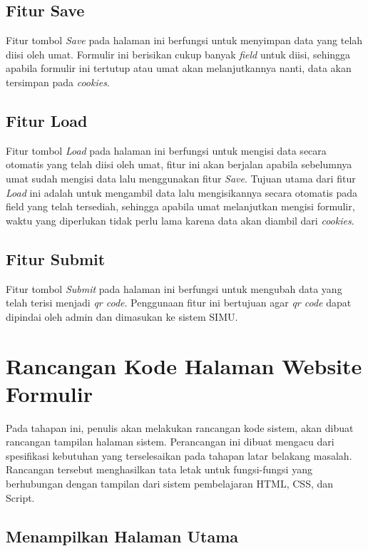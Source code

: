 \subsection{Fitur Save}
\label{sec:save}

Fitur tombol \textit{Save} pada halaman ini berfungsi untuk menyimpan data yang telah diisi oleh umat. Formulir ini berisikan cukup banyak \textit{field} untuk diisi, sehingga apabila formulir ini tertutup atau umat akan melanjutkannya nanti, data akan tersimpan pada \textit{cookies}.

\subsection{Fitur Load}
\label{sec:load}

Fitur tombol \textit{Load} pada halaman ini berfungsi untuk mengisi data secara otomatis yang telah diisi oleh umat, fitur ini akan berjalan apabila sebelumnya umat sudah mengisi data lalu menggunakan fitur \textit{Save}. Tujuan utama dari fitur \textit{Load} ini adalah untuk mengambil data lalu mengisikannya secara otomatis pada field yang telah tersediah, sehingga apabila umat melanjutkan mengisi formulir, waktu yang diperlukan tidak perlu lama karena data akan diambil dari \textit{cookies}.

\subsection{Fitur Submit}
\label{sec:submit}

Fitur tombol \textit{Submit} pada halaman ini berfungsi untuk mengubah data yang telah terisi menjadi \textit{qr code}. Penggunaan fitur ini bertujuan agar \textit{qr code} dapat dipindai oleh admin dan dimasukan ke sistem SIMU.

\section{Rancangan Kode Halaman Website Formulir}
\label{sec:rancanganKodeFormulir}

Pada tahapan ini, penulis akan melakukan rancangan kode sistem, akan dibuat rancangan tampilan halaman sistem. Perancangan ini dibuat mengacu dari spesifikasi kebutuhan yang terselesaikan pada tahapan latar belakang masalah. Rancangan tersebut menghasilkan tata letak untuk fungsi-fungsi yang berhubungan dengan tampilan dari sistem pembelajaran HTML, CSS, dan Script. 

\subsection{Menampilkan Halaman Utama}
\label{sec:index}

